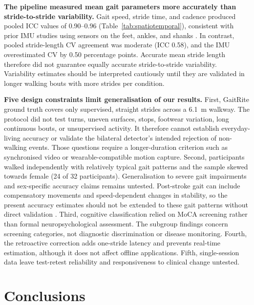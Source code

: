 \documentclass[11pt]{article}
\begin{document}
\textbf{The pipeline measured mean gait parameters more accurately than stride-to-stride variability.} Gait speed, stride time, and cadence produced pooled ICC values of 0.90--0.96 (Table~\ref{tab:spatiotemporal}), consistent with prior IMU studies using sensors on the feet, ankles, and shanks \citep{Trojaniello2014, Washabaugh2017}. In contrast, pooled stride-length CV agreement was moderate (ICC 0.58), and the IMU overestimated CV by 0.50 percentage points. Accurate mean stride length therefore did not guarantee equally accurate stride-to-stride variability. Variability estimates should be interpreted cautiously until they are validated in longer walking bouts with more strides per condition.

\textbf{Five design constraints limit generalisation of our results.} First, GaitRite ground truth covers only supervised, straight strides across a 6.1~m walkway. The protocol did not test turns, uneven surfaces, stops, footwear variation, long continuous bouts, or unsupervised activity. It therefore cannot establish everyday-living accuracy or validate the bilateral detector's intended rejection of non-walking events. Those questions require a longer-duration criterion such as synchronised video or wearable-compatible motion capture. Second, participants walked independently with relatively typical gait patterns and the sample skewed towards female (24 of 32 participants). Generalisation to severe gait impairments and sex-specific accuracy claims remains untested. Post-stroke gait can include compensatory movements and speed-dependent changes in stability, so the present accuracy estimates should not be extended to these gait patterns without direct validation \citep{Awad2017Compensations, Awad2023}. Third, cognitive classification relied on MoCA screening rather than formal neuropsychological assessment. The subgroup findings concern screening categories, not diagnostic discrimination or disease monitoring. Fourth, the retroactive correction adds one-stride latency and prevents real-time estimation, although it does not affect offline applications. Fifth, single-session data leave test-retest reliability and responsiveness to clinical change untested.


\clearpage
\section{Conclusions}
\end{document}

